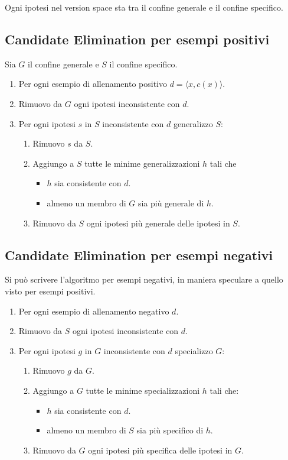 \begin{theorem}
	Ogni ipotesi nel version space sta tra il confine generale e il confine specifico.
\end{theorem}

\subsection{Candidate Elimination per esempi positivi}
Sia $G$ il confine generale e $S$ il confine specifico.
\begin{enumerate}
	\item Per ogni esempio di allenamento positivo $d = \langle x, c(x) \rangle$.
	\item Rimuovo da $G$ ogni ipotesi inconsistente con $d$.
	\item Per ogni ipotesi $s$ in $S$ inconsistente con $d$ generalizzo $S$:
	      \begin{enumerate}
		      \item Rimuovo $s$ da $S$.
		      \item Aggiungo a $S$ tutte le minime generalizzazioni $h$ tali che
		            \begin{itemize}
			            \item $h$ sia consistente con $d$.
			            \item almeno un membro di $G$ sia pi\`u generale di $h$.
		            \end{itemize}
		      \item Rimuovo da $S$ ogni ipotesi pi\`u generale delle ipotesi in $S$.
	      \end{enumerate}
\end{enumerate}

\subsection{Candidate Elimination per esempi negativi}
Si pu\`o scrivere l'algoritmo per esempi negativi, in maniera speculare a quello visto per esempi positivi.
\begin{enumerate}
	\item Per ogni esempio di allenamento negativo $d$.
	\item Rimuovo da $S$ ogni ipotesi inconsistente con $d$.
	\item Per ogni ipotesi $g$ in $G$ inconsistente con $d$ specializzo $G$:
	      \begin{enumerate}
		      \item Rimuovo $g$ da $G$.
		      \item Aggiungo a $G$ tutte le minime specializzazioni $h$ tali che:
		            \begin{itemize}
			            \item $h$ sia consistente con $d$.
			            \item almeno un membro di $S$ sia pi\`u specifico di $h$.
		            \end{itemize}
		      \item Rimuovo da $G$ ogni ipotesi pi\`u specifica delle ipotesi in $G$.
	      \end{enumerate}
\end{enumerate}

